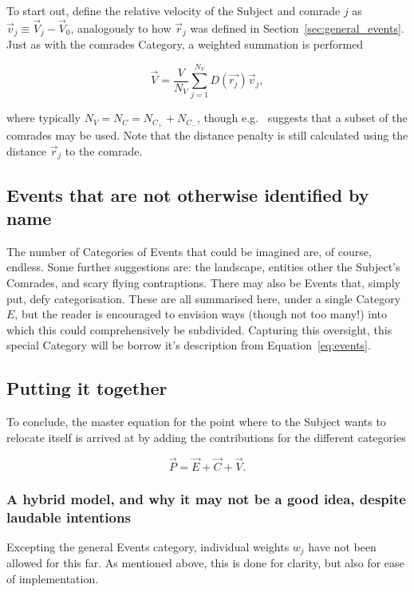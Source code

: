 \documentclass[]{article} %
\begin{document}
To start out, define the relative velocity of the Subject and comrade $j$ as $\vec{v}_j \equiv \vec{V}_j - \vec{V}_0$, analogously to how $\vec{r}_j$ was defined in Section~\ref{sec:general_events}.
Just as with the comrades Category, a weighted summation is performed

\begin{equation}
 \label{eq:velocities}
 \vec{V} = \frac{V}{N_V}\sum_{j=1}^{N_V} D(\vec{r_j}) \vec{v}_j,
\end{equation}

\noindent where typically $N_V = N_C = N_{C_+} + N_{C_-}$, though e.g.~\cite{Chiang2009} suggests that a subset of the comrades may be used.
Note that the distance penalty is still calculated using the distance $\vec{r}_j$ to the comrade.


\subsection{Events that are not otherwise identified by name}
\label{sec:noibn}
The number of Categories of Events that could be imagined are, of course, endless.
Some further suggestions are: the landscape, entities other the Subject's Comrades, and scary flying contraptions.
There may also be Events that, simply put, defy categorisation.
These are all summarised here, under a single Category $E$, but the reader is encouraged to envision ways (though not too many!) into which this could comprehensively be subdivided.
Capturing this oversight, this special Category will be borrow it's description from Equation~\eqref{eq:events}.


\subsection{Putting it together}
\label{sec:conclusion}
To conclude, the master equation for the point where to the Subject wants to relocate itself is arrived at by adding the contributions for the different categories

\begin{equation}
 \label{eq:WSOGMM}
 \vec{P} = \vec{E} + \vec{C} + \vec{V}.
\end{equation}


\subsubsection{A hybrid model, and why it may not be a good idea, despite laudable intentions}
\label{sec:hybrid}
Excepting the general Events category, individual weights $w_j$ have not been allowed for this far.
As mentioned above, this is done for clarity, but also for ease of implementation.
\end{document}

